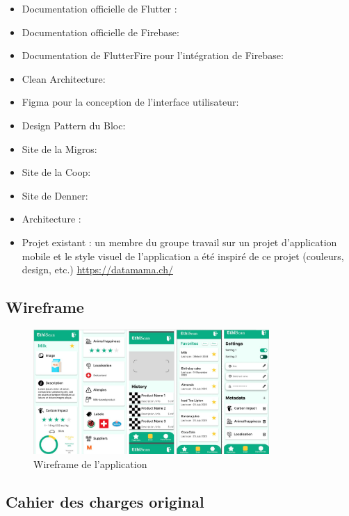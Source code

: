 \begin{itemize}[noitemsep]
    \item Documentation officielle de Flutter : \cite{flutterDocs}
    \item Documentation officielle de Firebase: \cite{firebaseDocs}
    \item Documentation de FlutterFire pour l'intégration de Firebase: \cite{flutterFireDocs}
    \item Clean Architecture: \cite{cleanArchitecture}
    \item Figma pour la conception de l'interface utilisateur: \cite{figma}
    \item Design Pattern du Bloc: \cite{blocPattern}
    \item Site de la Migros: \cite{migros}
    \item Site de la Coop: \cite{coop}
    \item Site de Denner: \cite{denner}
    \item Architecture : \cite{googleCloudArchitecture}
    \item Projet existant : un membre du groupe travail sur un projet d'application mobile et le style visuel de l'application a été inspiré de ce projet (couleurs, design, etc.) \url{https://datamama.ch/}
\end{itemize}


\subsection{Wireframe}
\label{doc:wireframe}

\begin{figure}[H]
    \centering
    \includegraphics[width=0.8\textwidth]{images/wireframe.png}
    \caption{Wireframe de l'application}
    \label{doc:wireframe}
\end{figure}

\subsection{Cahier des charges original}

